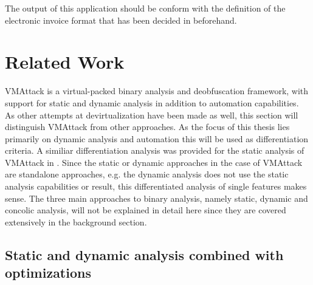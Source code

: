 \documentclass[10pt,twoside,a4paper,bibliography=totoc]{scrbook}
\begin{document}
The output of this application should be conform with the definition of the electronic invoice format that has been decided in beforehand.



\section{Related Work}
\label{sec1:relwork}
VMAttack is a virtual-packed binary analysis and deobfuscation framework, with support for static and dynamic analysis in addition to automation capabilities. As other attempts at devirtualization have been made as well, this section will distinguish VMAttack from other approaches. As the focus of this thesis lies primarily on dynamic analysis and automation this will be used as differentiation criteria. A similiar differentiation analysis was provided for the static analysis of VMAttack in \cite{Krau:Thesis2016}. Since the static or dynamic approaches in the case of VMAttack are standalone approaches, e.g. the dynamic analysis does not use the static analysis capabilities or result, this differentiated analysis of single features makes sense.
The three main approaches to binary analysis, namely static, dynamic and concolic analysis, will not be explained in detail here since they are covered extensively in the background section. 

\subsection{Static and dynamic analysis combined with optimizations}
\end{document}
